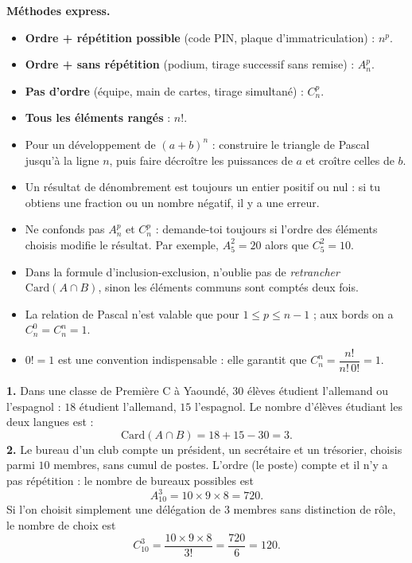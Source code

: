\documentclass[11pt]{article}
\newcommand{\cle}[1]{{\popxbold\color{popdark}#1}}
\begin{document}
\begin{aretenir}
\textbf{Méthodes express.}
\begin{itemize}
\item \textbf{Ordre + répétition possible} (code PIN, plaque d'immatriculation) : $n^p$.
\item \textbf{Ordre + sans répétition} (podium, tirage successif sans remise) : $A_n^p$.
\item \textbf{Pas d'ordre} (équipe, main de cartes, tirage simultané) : $C_n^p$.
\item \textbf{Tous les éléments rangés} : $n!$.
\item Pour un développement de $(a+b)^n$ : construire le triangle de Pascal jusqu'à la ligne $n$, puis faire décroître les puissances de $a$ et croître celles de $b$.
\end{itemize}
\end{aretenir}

\begin{attention}
\begin{itemize}
\item Un résultat de dénombrement est toujours un \cle{entier positif ou nul} : si tu obtiens une fraction ou un nombre négatif, il y a une erreur.
\item Ne confonds pas $A_n^p$ et $C_n^p$ : demande-toi toujours si l'\cle{ordre} des éléments choisis modifie le résultat. Par exemple, $A_5^2=20$ alors que $C_5^2=10$.
\item Dans la formule d'inclusion-exclusion, n'oublie pas de \emph{retrancher} $\mathrm{Card}(A\cap B)$, sinon les éléments communs sont comptés deux fois.
\item La relation de Pascal n'est valable que pour $1\le p\le n-1$ ; aux bords on a $C_n^0=C_n^n=1$.
\item $0!=1$ est une convention indispensable : elle garantit que $C_n^n=\dfrac{n!}{n!\,0!}=1$.
\end{itemize}
\end{attention}

\begin{exemplebox}
\textbf{1.} Dans une classe de Première C à Yaoundé, $30$ élèves étudient l'allemand ou l'espagnol : $18$ étudient l'allemand, $15$ l'espagnol. Le nombre d'élèves étudiant les deux langues est :
\[ \mathrm{Card}(A\cap B)=18+15-30=3. \]
\textbf{2.} Le bureau d'un club compte un président, un secrétaire et un trésorier, choisis parmi $10$ membres, sans cumul de postes. L'ordre (le poste) compte et il n'y a pas répétition : le nombre de bureaux possibles est
\[ A_{10}^{3}=10\times 9\times 8=720. \]
Si l'on choisit simplement une délégation de $3$ membres sans distinction de rôle, le nombre de choix est
\[ C_{10}^{3}=\dfrac{10\times 9\times 8}{3!}=\dfrac{720}{6}=120. \]
\end{exemplebox}
\end{document}
